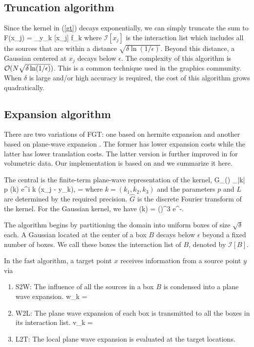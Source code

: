 \documentclass[conference]{IEEEtran}
\begin{document}
\subsection{Truncation algorithm} 
Since the kernel in (\ref{gt}) decays exponentially, we can simply truncate the sum to
%
\beq F(x_j) = \sum_{y_k \in {}[x_j]}  f_k \eeq
%
where $\mathcal{I}[x_j]$ is the interaction list which includes all the sources that are within a distance $\sqrt{\delta \ln (1/\epsilon)}$. Beyond this distance, a Gaussian centered at $x_j$ decays below $\epsilon$. The complexity of this algorithm is $\mathcal{O}(N \sqrt{\delta \ln(1/\epsilon)})$. This is a common technique used in the graphics community. When $\delta$ is large and/or high accuracy is required, the cost of this algorithm grows quadratically.  

\subsection{Expansion algorithm}
There are two variations of FGT: one based on hermite expansion \cite{fgt} and another based on plane-wave expansion \cite{greengard98}. The former has lower expansion costs while the latter has lower translation costs. The latter version is further improved in \cite{fggt} for volumetric data. Our implementation is based on \cite{fggt} and we summarize it here. 

The central is the finite-term plane-wave representation of the kernel,
\beq G_\delta() \approx \sum_{|k| \leq p} (k) e^{i \lambda k \cdot (x_j - y_k)}, \quad \lambda = \eeq
where $k = (k_1, k_2, k_3)$ and the parameters $p$ and $L$ are determined by the required precision. $\hat{G}$ is the discrete Fourier transform of the kernel. For the Gaussian kernel, we have 
\beq {}(k) = \left(\right)^3 e^{-}.\eeq

The algorithm begins by partitioning the domain into uniform boxes of size $\sqrt{\delta}$ each. A Gaussian located at the center of a box $B$ decays below $\epsilon$ beyond a fixed number of boxes. We call these boxes the interaction list of $B$, denoted by $\mathcal{I}[B]$. 

In the fast algorithm, a target point $x$ receives information from a source point $y$ via 
\begin{enumerate}
\item{S2W:} The influence of all the sources in a box $B$ is condensed into a plane wave expansion.
            \beq w_k = \eeq
\item{W2L:} The plane wave expansion of each box is transmitted to all the boxes in its interaction list. 
            \beq v_k = \eeq
\item{L2T:} The local plane wave expansion is evaluated at the target locations. 
\end{enumerate} 
\end{document}
